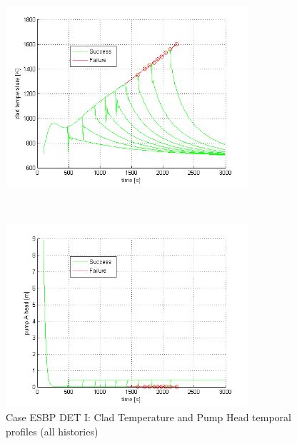\documentclass{mc2013}
\begin{document}
\begin{figure}
 \begin{minipage}[b]{8.5cm}
   \centering
   \includegraphics[width=9cm]{figures/DETpbClad.png}
 \end{minipage}
 \ \hspace{2mm} \hspace{3mm} \
 \begin{minipage}[b]{8.5cm}
   \centering
   \includegraphics[width=9cm]{figures/DETpbHead.png}
 \end{minipage}
\caption{Case ESBP DET I: Clad Temperature and Pump Head temporal profiles (all histories)}
\label{fig:ESBPall}
\end{figure}
\vspace{-5mm}
\end{document}
